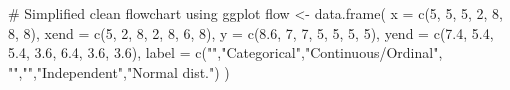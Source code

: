 \documentclass[
  12pt,
  letterpaper,
]{book}
\newenvironment{Shaded}{\begin{snugshade}}{\end{snugshade}}
\newcommand{\AttributeTok}[1]{\textcolor[rgb]{0.40,0.45,0.13}{#1}}
\newcommand{\CommentTok}[1]{\textcolor[rgb]{0.37,0.37,0.37}{#1}}
\newcommand{\DecValTok}[1]{\textcolor[rgb]{0.68,0.00,0.00}{#1}}
\newcommand{\FloatTok}[1]{\textcolor[rgb]{0.68,0.00,0.00}{#1}}
\newcommand{\FunctionTok}[1]{\textcolor[rgb]{0.28,0.35,0.67}{#1}}
\newcommand{\NormalTok}[1]{\textcolor[rgb]{0.00,0.23,0.31}{#1}}
\newcommand{\OtherTok}[1]{\textcolor[rgb]{0.00,0.23,0.31}{#1}}
\newcommand{\StringTok}[1]{\textcolor[rgb]{0.13,0.47,0.30}{#1}}
\begin{document}
\begin{Shaded}
\begin{Highlighting}[]
\CommentTok{\# Simplified clean flowchart using ggplot}
\NormalTok{flow }\OtherTok{\textless{}{-}} \FunctionTok{data.frame}\NormalTok{(}
  \AttributeTok{x =}     \FunctionTok{c}\NormalTok{(}\DecValTok{5}\NormalTok{,   }\DecValTok{5}\NormalTok{,   }\DecValTok{5}\NormalTok{,   }\DecValTok{2}\NormalTok{,   }\DecValTok{8}\NormalTok{,   }\DecValTok{8}\NormalTok{,   }\DecValTok{8}\NormalTok{),}
  \AttributeTok{xend =}  \FunctionTok{c}\NormalTok{(}\DecValTok{5}\NormalTok{,   }\DecValTok{2}\NormalTok{,   }\DecValTok{8}\NormalTok{,   }\DecValTok{2}\NormalTok{,   }\DecValTok{8}\NormalTok{,   }\DecValTok{6}\NormalTok{,   }\DecValTok{8}\NormalTok{),}
  \AttributeTok{y =}     \FunctionTok{c}\NormalTok{(}\FloatTok{8.6}\NormalTok{, }\DecValTok{7}\NormalTok{,   }\DecValTok{7}\NormalTok{,   }\DecValTok{5}\NormalTok{,   }\DecValTok{5}\NormalTok{,   }\DecValTok{5}\NormalTok{,   }\DecValTok{5}\NormalTok{),}
  \AttributeTok{yend =}  \FunctionTok{c}\NormalTok{(}\FloatTok{7.4}\NormalTok{, }\FloatTok{5.4}\NormalTok{, }\FloatTok{5.4}\NormalTok{, }\FloatTok{3.6}\NormalTok{, }\FloatTok{6.4}\NormalTok{, }\FloatTok{3.6}\NormalTok{, }\FloatTok{3.6}\NormalTok{),}
  \AttributeTok{label =} \FunctionTok{c}\NormalTok{(}\StringTok{""}\NormalTok{,}\StringTok{"Categorical"}\NormalTok{,}\StringTok{"Continuous/Ordinal"}\NormalTok{,}
            \StringTok{""}\NormalTok{,}\StringTok{""}\NormalTok{,}\StringTok{"Independent"}\NormalTok{,}\StringTok{"Normal dist."}\NormalTok{)}
\NormalTok{)}


\end{Highlighting}
\end{Shaded}
\end{document}
